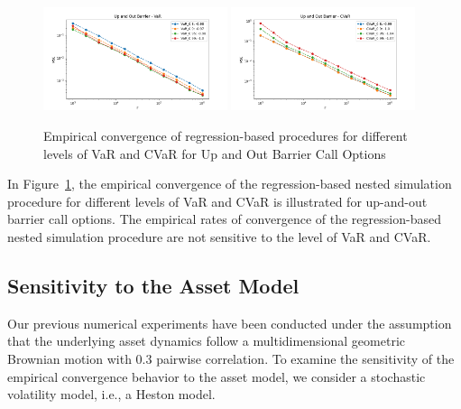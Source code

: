 \begin{figure}[ht!] 
    \centering
    \includegraphics[width=0.48\textwidth]{./project1/figures/figure9a.png}
    \includegraphics[width=0.48\textwidth]{./project1/figures/figure9b.png}
    \caption{Empirical convergence of regression-based procedures for different levels of VaR and CVaR for Up and Out Barrier Call Options}
    \label{fig1:sens_level}
\end{figure}

In Figure~\ref{fig1:sens_level}, the empirical convergence of the regression-based nested simulation procedure for different levels of VaR and CVaR is illustrated for up-and-out barrier call options.
The empirical rates of convergence of the regression-based nested simulation procedure are not sensitive to the level of VaR and CVaR.

\subsection{Sensitivity to the Asset Model} \label{sec1:sensitivity-assetModel}

Our previous numerical experiments have been conducted under the assumption that the underlying asset dynamics follow a multidimensional geometric Brownian motion with $0.3$ pairwise correlation.
To examine the sensitivity of the empirical convergence behavior to the asset model, we consider a stochastic volatility model, i.e., a Heston model.

